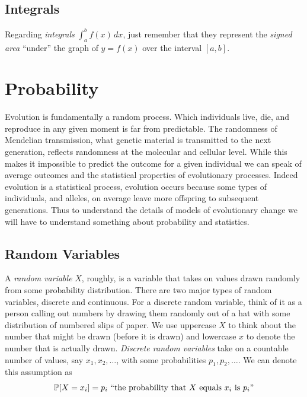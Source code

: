 \subsection{Integrals} Regarding  \emph{integrals} $\int_a^b f(x)\,dx$, just remember that
they represent the \emph{signed area} ``under'' the graph of $y=f(x)$
over the interval $[a,b]$. %

\section{Probability}
Evolution is fundamentally a random process. Which individuals live,
die, and reproduce in any given moment is far from predictable. The randomness of Mendelian transmission, what genetic material
is transmitted to the next generation, reflects randomness at the
molecular and cellular level. While this makes it impossible to
predict the outcome for a given individual we can speak of average
outcomes and the statistical properties of evolutionary
processes. Indeed evolution is a statistical process,
evolution occurs because some types of individuals, and alleles, on
average leave more offspring to subsequent generations. Thus to
understand the details of models of evolutionary change we will have to understand something
about probability and statistics. 

\subsection{Random Variables} \label{Section_rv}

A  \emph{random variable} $X$, roughly,
is a variable that takes on values drawn randomly from some
probability distribution.  There are two major types of random
variables, discrete and continuous.  For a discrete random variable, think of it as a person calling out numbers
by drawing them randomly out of a hat with some distribution of
numbered slips of paper. We use uppercase $X$ to think about the
number that might be drawn (before it is drawn) and lowercase $x$ to denote the number that is actually drawn.
\emph{Discrete random variables} take on a countable number of values, say $x_1,x_2,\dots$, with some probabilities $p_1,p_2,\dots$. We can denote this assumption as 
\[
\P[X=x_i]=p_i \mbox{ ``the probability that $X$ equals $x_i$ is $p_i$''}
\]

